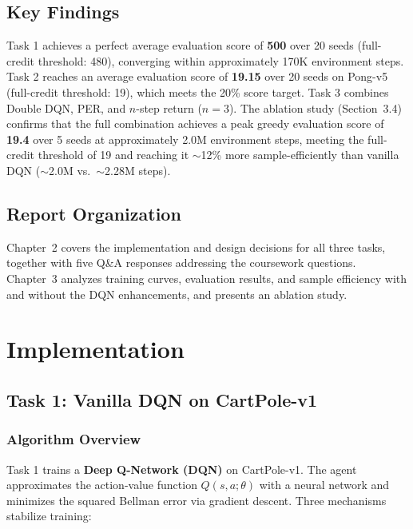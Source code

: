 \documentclass[12pt, a4paper]{report}
\begin{document}
\section*{Key Findings}

Task 1 achieves a perfect average evaluation score of \textbf{500} over 20 seeds (full-credit
threshold: 480), converging within approximately 170K environment steps.
Task 2 reaches an average evaluation score of \textbf{19.15} over 20 seeds on Pong-v5
(full-credit threshold: 19), which meets the 20\% score target.
Task 3 combines Double DQN, PER, and $n$-step return ($n=3$).
The ablation study (Section~3.4) confirms that the full combination achieves a peak greedy
evaluation score of \textbf{19.4} over 5 seeds at approximately 2.0M environment steps,
meeting the full-credit threshold of 19 and reaching it $\sim$12\% more sample-efficiently
than vanilla DQN ($\sim$2.0M vs.\ $\sim$2.28M steps).

\section*{Report Organization}

Chapter~2 covers the implementation and design decisions for all three tasks, together with five Q\&A
responses addressing the coursework questions. Chapter~3 analyzes training curves, evaluation results,
and sample efficiency with and without the DQN enhancements, and presents an ablation study.

\chapter{Implementation}

\section{Task 1: Vanilla DQN on CartPole-v1}

\subsection{Algorithm Overview}

Task 1 trains a \textbf{Deep Q-Network (DQN)} on CartPole-v1. The agent approximates the
action-value function $Q(s,a;\theta)$ with a neural network and minimizes the squared Bellman error
via gradient descent. Three mechanisms stabilize training:
\end{document}
